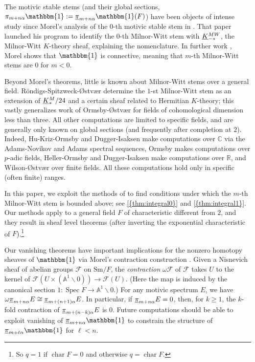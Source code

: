 \documentclass[10pt]{amsart}
\numberwithin{equation}{section}
\theoremstyle{plain}
\theoremstyle{definition}
\theoremstyle{remark}
\begin{document}
The motivic stable stems (and their global sections, $\pi_{m+n\alpha}{\mathbbm{1}} := {\underline{\smash{\pi}}}_{m+n\alpha}{\mathbbm{1}}(F)$) have been objects of intense study since Morel's analysis of the $0$-th motivic stable stem in \cite{morel:suite}.  That paper launched his program \cite{morel:pi0} to identify the $0$-th Milnor-Witt stem with ${\underline{\smash{K}}}^{MW}_{-*}$, the Milnor-Witt $K$-theory sheaf, explaining the nomenclature.  In further work \cite{morel:conn}, Morel shows that ${\mathbbm{1}}$ is connective, meaning that $m$-th Milnor-Witt stems are $0$ for $m<0$.

Beyond Morel's theorems, little is known about Milnor-Witt stems over a general field.  R\"ondigs-Spitzweck-{\O}stv{\ae}r \cite{RSO:pi1} determine the $1$-st Milnor-Witt stem as an extension of ${\underline{\smash{K}}}^M_*/24$ and a certain sheaf related to Hermitian $K$-theory; this vastly generalizes work of Ormsby-{\O}stv{\ae}r \cite{MR3255457} for fields of cohomological dimension less than three.
All other computations are limited to specific fields, and are generally only known on global sections (and frequently after completion at $2$).  Indeed, Hu-Kriz-Ormsby \cite{hko:C} and Dugger-Isaksen \cite{di:mass} make computations over ${\mathbb{C}}$ via the Adams-Novikov and Adams spectral sequences, Ormsby \cite{o:thesis} makes computations over $p$-adic fields, Heller-Ormsby \cite{ho:e2m, ho:e2m2} and Dugger-Isaksen \cite{di:RC2,di:lowR} make computations over ${\mathbb{R}}$, 
and Wilson-{\O}stv{\ae}r \cite{WO:ff} over finite fields. All these computations hold only in specific (often finite) ranges.

In this paper, we exploit the methods of \cite{RSO:pi1} to find conditions under which the $m$-th Milnor-Witt stem is bounded above; see {\autoref{{thm:integral0}}} and {\autoref{{thm:integral1}}}.  Our methods apply to a general field $F$ of characteristic different from $2$, and they result in sheaf level theorems (after inverting the exponential characteristic of $F$).\footnote{So $q=1$ if ${\operatorname{char}} F = 0$ and otherwise $q={\operatorname{char}} F$.}

Our vanishing theorems have important implications for the nonzero homotopy sheaves of ${\mathbbm{1}}$ via Morel's contraction construction \cite{morel:A1}.  Given a Nisnevich sheaf of abelian groups ${\mathscr{F}}$ on ${\mathrm{Sm}}/F$, the \emph{contraction} $\omega{\mathscr{F}}$ of ${\mathscr{F}}$ takes $U$ to the kernel of ${\mathscr{F}}(U\times ({\mathbb{A}}^1\smallsetminus 0))\to {\mathscr{F}}(U)$.  (Here the map is induced by the canonical section $1:{\operatorname{Spec}} F\to {\mathbb{A}}^1\smallsetminus 0$.)  For any motivic spectrum $E$, we have $\omega{\underline{\smash{\pi}}}_{m+n\alpha}E \cong {\underline{\smash{\pi}}}_{m+(n+1)\alpha}E$.  In particular, if ${\underline{\smash{\pi}}}_{m+n\alpha}E = 0$, then, for $k\ge 1$, the $k$-fold contraction of ${\underline{\smash{\pi}}}_{m+(n-k)\alpha}E$ is $0$.  Future computations should be able to exploit vanishing of ${\underline{\smash{\pi}}}_{m+n\alpha}{\mathbbm{1}}$ to constrain the structure of ${\underline{\smash{\pi}}}_{m+\ell\alpha}{\mathbbm{1}}$ for $\ell<n$.
\end{document}
